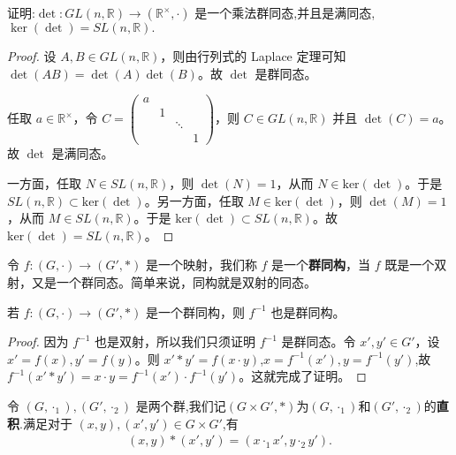 \documentclass[../../main.tex]{subfiles}
\begin{document}
\begin{example}\label{example:行列是就是一个乘法群同态}
证明:$\det : GL(n, \mathbb{R}) \to (\mathbb{R}^\times, \cdot)$ 是一个乘法群同态,并且是满同态,$\ker (\det)=SL(n, \mathbb{R}).$
\end{example}
\begin{proof}
设 \(A, B \in GL(n, \mathbb{R})\)，则由行列式的 Laplace 定理可知 \(\det(AB) = \det(A)\det(B)\)。故 \(\det\) 是群同态。

任取 \(a \in \mathbb{R}^{\times}\)，令 \(C = \begin{pmatrix}
a & & & \\
& 1 & & \\
& & \ddots & \\
& & & 1
\end{pmatrix}\)，则 \(C \in GL(n, \mathbb{R})\) 并且 \(\det(C) = a\)。故 \(\det\) 是满同态。

一方面，任取 \(N \in SL(n, \mathbb{R})\)，则 \(\det(N) = 1\)，从而 \(N \in \mathrm{ker}(\det)\)。于是 \(SL(n, \mathbb{R}) \subset \mathrm{ker}(\det)\)。另一方面，任取 \(M \in \mathrm{ker}(\det)\)，则 \(\det(M) = 1\)，从而 \(M \in SL(n, \mathbb{R})\)。于是 \(\mathrm{ker}(\det) \subset SL(n, \mathbb{R})\)。故 \(\mathrm{ker}(\det) = SL(n, \mathbb{R})\)。 

\end{proof}

\begin{definition}[群同构]
令 $f:(G,\cdot)\to (G',*)$ 是一个映射，我们称 $f$ 是一个\textbf{群同构}，当 $f$ 既是一个双射，又是一个群同态。简单来说，同构就是双射的同态。
\end{definition}

\begin{proposition}[群同构的逆也是群同构]\label{proposition:群同构的逆也是群同构}
若 $f:(G,\cdot)\to (G',*)$ 是一个群同构，则 $f^{-1}$ 也是群同构。
\end{proposition}
\begin{proof}
因为 $f^{-1}$ 也是双射，所以我们只须证明 $f^{-1}$ 是群同态。令 $x',y'\in G'$，设 $x' = f(x),y' = f(y)$。则 $x'*y' = f(x\cdot y)$,$x=f^{-1}(x'),y=f^{-1}(y')$,故 $f^{-1}(x'*y')=x\cdot y = f^{-1}(x')\cdot f^{-1}(y')$。这就完成了证明。 

\end{proof}

\begin{definition}[两个群的直积]
令 $(G,\cdot_1),(G',\cdot_2)$ 是两个群,我们记$(G\times G',*)$为$(G,\cdot_1)$和$(G',\cdot_2)$的\textbf{直积}.满足对于 $(x,y),(x',y')\in G\times G'$,有
\begin{align*}
(x,y)*(x',y')=(x\cdot_1 x',y\cdot_2 y').
\end{align*}
\end{definition}
\end{document}
